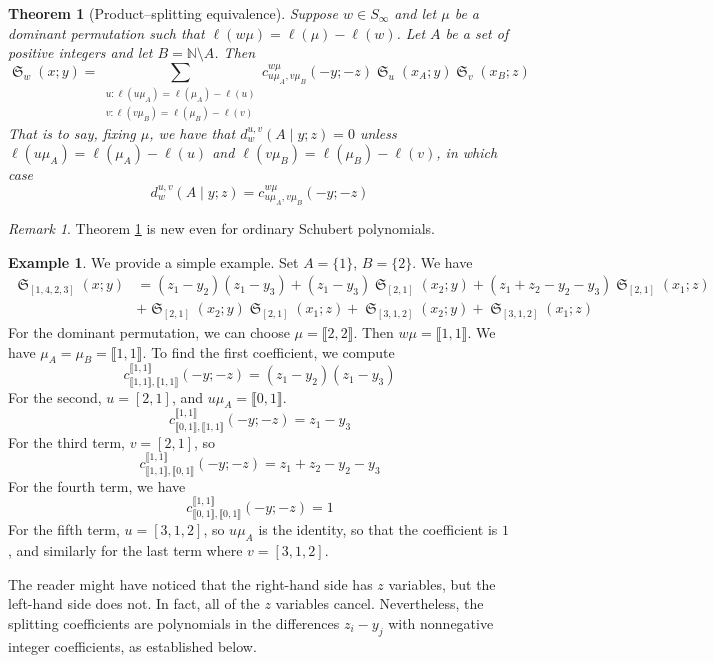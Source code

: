 \documentclass[reqno]{amsart}
\newtheorem{theorem}{Theorem}[section]
\theoremstyle{definition}
\newtheorem{example}[lemma]{Example}
\theoremstyle{remark}
\newtheorem*{remark}{Remark}
\numberwithin{equation}{subsection}
\DeclareMathOperator{\sch}{\mathfrak{S}}
\newcommand{\cperm}[1]{\llbracket #1\rrbracket}
\newcommand{\cpcf}[5]{d^{#1,#2}_{#3}\left(#4\mid #5\right)}
\begin{document}
\begin{theorem}[Product--splitting equivalence] \label{theorem:doublecoprodpos}
Suppose $w\in S_\infty$ and let $\mu$ be a dominant permutation such that $\ell(w\mu)=\ell(\mu)-\ell(w)$. Let $A$ be a set of positive integers and let $B=\mathbb{N}\setminus A$. Then
$$\sch_w(x;y)=\sum_{\substack{u:\ell(u\mu_A)=\ell(\mu_A)-\ell(u)\\v:\ell(v\mu_B)=\ell(\mu_B)-\ell(v)}}c_{u\mu_A,v\mu_B}^{w\mu}(-y;-z)\sch_u(x_A;y)\sch_v(x_B;z)$$
That is to say, fixing $\mu$, we have that $\cpcf{u}{v}{w}{A}{y;z}=0$ unless $\ell(u\mu_A)=\ell(\mu_A)-\ell(u)$ and $\ell(v\mu_B)=\ell(\mu_B)-\ell(v)$, in which case
$$\cpcf{u}{v}{w}{A}{y;z}=c_{u\mu_A,v\mu_B}^{w\mu}(-y;-z)$$
\end{theorem}

\begin{remark}
	Theorem \ref{theorem:doublecoprodpos} is new even for ordinary Schubert polynomials.
\end{remark}

\begin{example} 
	We provide a simple example. Set $A=\{1\}$, $B=\{2\}$. We have
	\begin{align*}
	\sch_{[1,4,2,3]}(x;y) &= (z_1-y_2)(z_1-y_3)+(z_1-y_3)\sch_{[2,1]}(x_2;y)+(z_1+z_2-y_2-y_3)\sch_{[2,1]}(x_1;z)\\
	&+\sch_{[2,1]}(x_2;y)\sch_{[2,1]}(x_1;z)+\sch_{[3,1,2]}(x_2;y)+\sch_{[3,1,2]}(x_1;z)
	\end{align*}
	For the dominant permutation, we can choose $\mu=\cperm{2,2}$. Then $w\mu = \cperm{1,1}$. We have $\mu_A=\mu_B=\cperm{1,1}$. To find the first coefficient, we compute
	$$c_{\cperm{1,1},\cperm{1,1}}^{\cperm{1,1}}(-y;-z)=(z_1-y_2)(z_1-y_3)$$
	For the second, $u=[2,1]$, and $u\mu_A=\cperm{0,1}$.
	$$c_{\cperm{0,1},\cperm{1,1}}^{\cperm{1,1}}(-y;-z)=z_1-y_3$$
	For the third term, $v=[2,1]$, so
	$$c_{\cperm{1,1},\cperm{0,1}}^{\cperm{1,1}}(-y;-z)=z_1+z_2-y_2-y_3$$
	 For the fourth term, we have
	$$c_{\cperm{0,1},\cperm{0,1}}^{\cperm{1,1}}(-y;-z)=1$$
	For the fifth term, $u=[3,1,2]$, so $u\mu_A$ is the identity, so that the coefficient is $1$, and similarly for the last term where $v=[3,1,2]$.
	
	The reader might have noticed that the right-hand side has $z$ variables, but the left-hand side does not. In fact, all of the $z$ variables cancel. Nevertheless, the splitting coefficients are polynomials in the differences $z_i-y_j$ with nonnegative integer coefficients, as established below.
\end{example}
\end{document}
